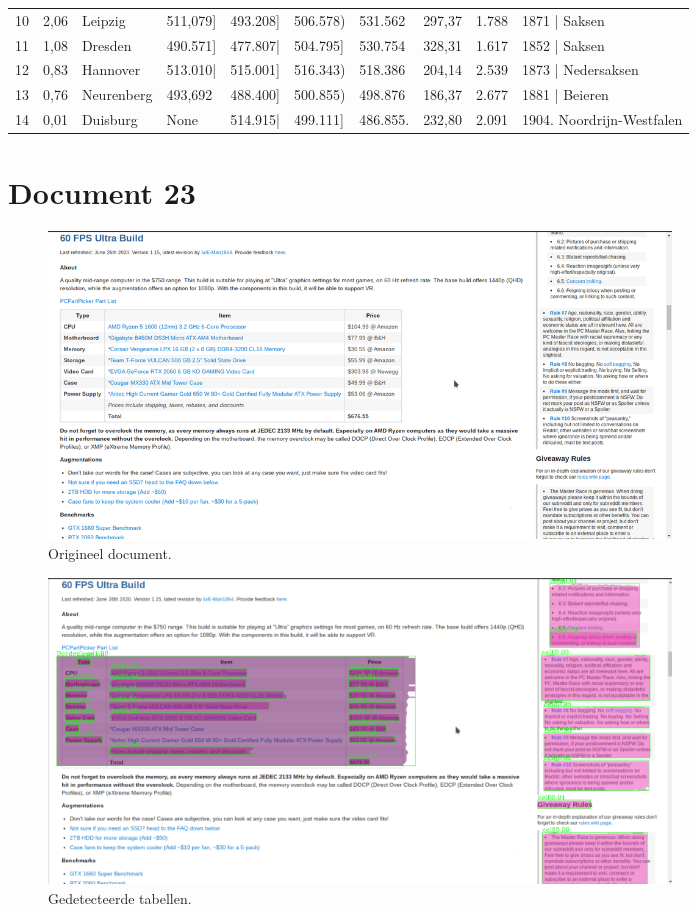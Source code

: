 \begin{tabular}{llllllllll}
10 &               2,06 &             Leipzig &   511,079] &     493.208] &     506.578) &      531.562 &                 297,37 &  1.788 &               1871 | Saksen \\
11 &               1,08 &             Dresden &   490.571] &     477.807| &     504.795] &      530.754 &                 328,31 &  1.617 &               1852 | Saksen \\
12 &               0,83 &            Hannover &   513.010| &     515.001] &     516.343) &      518.386 &                 204,14 &  2.539 &          1873 | Nedersaksen \\
13 &               0,76 &          Neurenberg &    493,692 &     488.400] &     500.855) &      498.876 &                 186,37 &  2.677 &              1881 | Beieren \\
14 &               0,01 &            Duisburg &       None &     514.915| &     499.111] &     486.855. &                 232,80 &  2.091 &   1904. Noordrijn-Westfalen \\
\bottomrule
\end{tabular}
\section{Document 23}

\begin{figure}[H]
    \centering
    \includegraphics[width=0.8\textwidth]{test-resultaten/23/original.png}
    \caption{Origineel document.}
\end{figure}

\begin{figure}[H]
    \centering
    \includegraphics[width=0.8\textwidth]{test-resultaten/23/detected_tables.png}
    \caption{Gedetecteerde tabellen.}
\end{figure}

